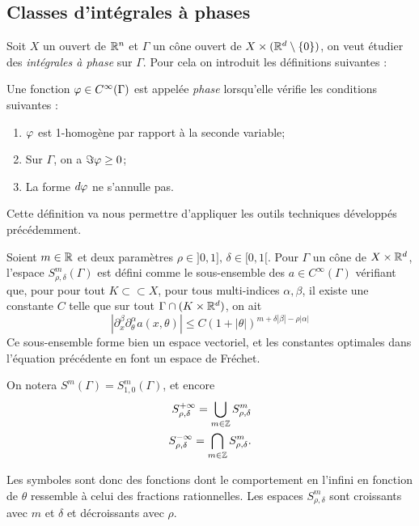 \subsection{Classes d'intégrales à phases}
Soit $X$ un ouvert de $\mathbb{R}^n$ et $\Gamma$ un cône ouvert de $X \times (\mathbb{R}^d \setminus \{0\})$, on veut étudier des \emph{intégrales à phase} sur $\Gamma$. Pour cela on introduit les définitions suivantes :

\begin{defn}\label{def:phase}Une fonction $\varphi \in C^{\infty}(\Gamma)$ est appelée \emph{phase} lorsqu'elle vérifie les conditions suivantes :
\begin{enumerate}
  \item $\varphi$ est 1-homogène par rapport à la seconde variable;
  \item Sur $\Gamma$, on a $\Im \varphi \geq 0$;
  \item La forme $d\varphi$ ne s'annulle pas.
\end{enumerate}
\end{defn}
Cette définition va nous permettre d'appliquer les outils techniques développés précédemment.

\begin{defn} Soient $m\in \mathbb{R}$ et deux paramètres $\rho \in ]0,1],\,\delta \in [0,1[$. Pour $\Gamma$ un cône de $X\times \mathbb{R}^d$, l'espace $S_{\rho,\delta}^m(\Gamma)$ est défini comme le sous-ensemble des $a \in C^\infty(\Gamma)$ vérifiant que, pour pour tout $K \subset \subset X$, pour tous multi-indices $\alpha,\beta$, il existe une constante $C$ telle que sur tout $\Gamma \cap (K\times \mathbb{R}^d)$, on ait
\begin{equation*}
  |\partial^{\beta}_x\partial^{\alpha}_{\theta}a(x,\theta)| \leq C(1+|\theta|)^{m+\delta|\beta|-\rho|\alpha|}
\end{equation*}
Ce sous-ensemble forme bien un espace vectoriel, et les constantes optimales dans l'équation précédente en font un espace de Fréchet.

On notera $S^m(\Gamma)=S^m_{1,0}(\Gamma)$, et encore
\begin{align*}
  S_{\rho,\delta}^{+\infty}=\bigcup_{m \in \mathbb{Z}}S^m_{\rho,\delta}\\
  S_{\rho,\delta}^{-\infty}=\bigcap_{m \in \mathbb{Z}}S^m_{\rho,\delta}.
\end{align*}
\end{defn}
Les symboles sont donc des fonctions dont le comportement en l'infini en fonction de $\theta$ ressemble à celui des fractions rationnelles. Les espaces $S^m_{\rho,\delta}$ sont croissants avec $m$ et $\delta$ et décroissants avec $\rho$.

